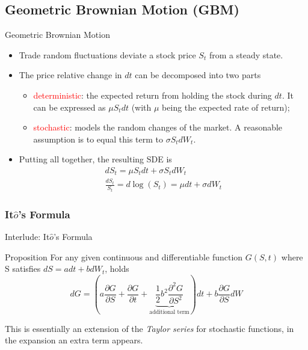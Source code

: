 \documentclass{beamer}
\begin{document}
\subsection{Geometric Brownian Motion (GBM)}
\begin{frame}{Geometric Brownian Motion}
	\begin{itemize}
		\item<0-> Trade random fluctuations deviate a stock price $S_t$ from a steady state.
		\item<0-> The price relative change in $dt$ can be decomposed into two parts
		\begin{itemize}
			\item<2-> \textcolor{red}{deterministic}: the expected return from holding the stock during $dt$. It can be expressed as $\mu S_tdt$ (with $\mu$ being the expected rate of return);
			\item<3-> \textcolor{red}{stochastic}: models the random changes of the market. A reasonable assumption is to equal this term to $\sigma S_t dW_t$. 
		\end{itemize}
		\item<4-> Putting all together, the resulting SDE is
		\begin{equation}
			\begin{gathered}
				dS_t = \mu S_t dt + \sigma S_t dW_t \\
				\frac{dS_t}{S_t} = d\log(S_t) = \mu dt + \sigma dW_t
			\end{gathered}
			\label{eq:log_normal_sde}
		\end{equation}
	\end{itemize}
\end{frame}

\subsubsection{It$\hat{o}$'s Formula}
\begin{frame}{Interlude: It$\hat{o}$'s Formula}
	\begin{block}{Proposition}
		For any given continuous and differentiable function $G(S,t)$ where S satisfies $dS=adt + bdW_t$, holds
		\begin{equation}
			dG = \left(a\frac{\partial G}{\partial S} + \frac{\partial G}{\partial t} + \underbrace{\frac{1}{2}b^2\frac{\partial^2 G}{\partial S^2}}_{\text{additional term}}\right)dt + b\frac{\partial G}{\partial S} dW
			\label{eq:itos_lemma}
		\end{equation}

	This is essentially an extension of the \emph{Taylor series} for stochastic functions, in the expansion an extra term appears.	
	\end{block}	
\end{frame}
\end{document}
